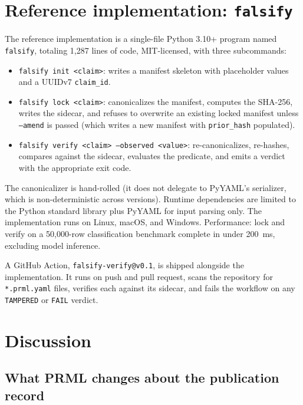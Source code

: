\documentclass[11pt, a4paper]{article}
\begin{document}
\section{Reference implementation: \texttt{falsify}}
\label{sec:impl}

The reference implementation is a single-file Python 3.10+ program named \texttt{falsify}, totaling 1{,}287 lines of code, MIT-licensed, with three subcommands:

\begin{itemize}[leftmargin=2em, itemsep=0.2em]
  \item \texttt{falsify init <claim>}: writes a manifest skeleton with placeholder values and a UUIDv7 \texttt{claim\_id}.
  \item \texttt{falsify lock <claim>}: canonicalizes the manifest, computes the SHA-256, writes the sidecar, and refuses to overwrite an existing locked manifest unless \texttt{--amend} is passed (which writes a new manifest with \texttt{prior\_hash} populated).
  \item \texttt{falsify verify <claim> --observed <value>}: re-canonicalizes, re-hashes, compares against the sidecar, evaluates the predicate, and emits a verdict with the appropriate exit code.
\end{itemize}

The canonicalizer is hand-rolled (it does not delegate to PyYAML's serializer, which is non-deterministic across versions). Runtime dependencies are limited to the Python standard library plus PyYAML for input parsing only. The implementation runs on Linux, macOS, and Windows. Performance: lock and verify on a 50{,}000-row classification benchmark complete in under 200~ms, excluding model inference.

A GitHub Action, \texttt{falsify-verify@v0.1}, is shipped alongside the implementation. It runs on push and pull request, scans the repository for \texttt{*.prml.yaml} files, verifies each against its sidecar, and fails the workflow on any \texttt{TAMPERED} or \texttt{FAIL} verdict.

\section{Discussion}
\label{sec:discussion}

\subsection{What PRML changes about the publication record}
\end{document}
